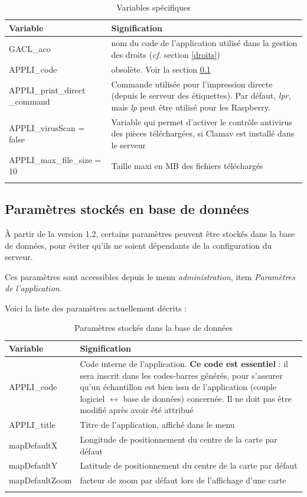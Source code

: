 \begin{longtable}{|p{4cm}|p{11cm}|}
\hline
\textbf{Variable} & \textbf{Signification} \\
\hline
\endhead
GACL\_aco & nom du code de l'application utilisé dans la gestion des droits (\textit{cf.} section \ref{droits})\\
\hline
APPLI\_code & obsolète. Voir la section \ref{paramdb} \\
\hline
APPLI\_print\_direct \_command & Commande utilisée pour l'impression directe (depuis le serveur des étiquettes). Par défaut, \textit{lpr}, mais \textit{lp} peut être utilisé pour les Raspberry. \\
\hline
APPLI\_virusScan = false & Variable qui permet d'activer le contrôle antivirus des pièces téléchargées, si Clamav est installé dans le serveur \\
\hline
APPLI\_max\_file\_size = 10 & Taille maxi en MB des fichiers téléchargés \\
\hline

\caption{Variables spécifiques}
\end{longtable}

\subsection{Paramètres stockés en base de données}
\label{paramdb}

À partir de la version 1.2, certains paramètres peuvent être stockés dans la base de données, pour éviter qu'ils ne soient dépendants de la configuration du serveur.

Ces paramètres sont accessibles depuis le menu \textit{administration}, item \textit{Paramètres de l'application}.

Voici la liste des paramètres actuellement décrits :
\begin{longtable}{|p{4cm}|p{11cm}|}
\hline
\textbf{Variable} & \textbf{Signification} \\
\hline
\endhead
APPLI\_code & Code interne de l'application. \textbf{Ce code est essentiel} : il sera inscrit dans les codes-barres générés, pour s'assurer qu'un échantillon est bien issu de l'application (couple logiciel $\leftrightarrow$ base de données) concernée. Il ne doit pas être modifié après avoir été attribué\\
\hline
APPLI\_title & Titre de l'application, affiché dans le menu \\
\hline
mapDefaultX & Longitude de positionnement du centre de la carte par défaut \\
\hline
mapDefaultY & Latitude de positionnement du centre de la carte par défaut \\
\hline
mapDefaultZoom & facteur de zoom par défaut lors de l'affichage d'une carte \\
\hline
\caption{Paramètres stockés dans la base de données}
\end{longtable}


